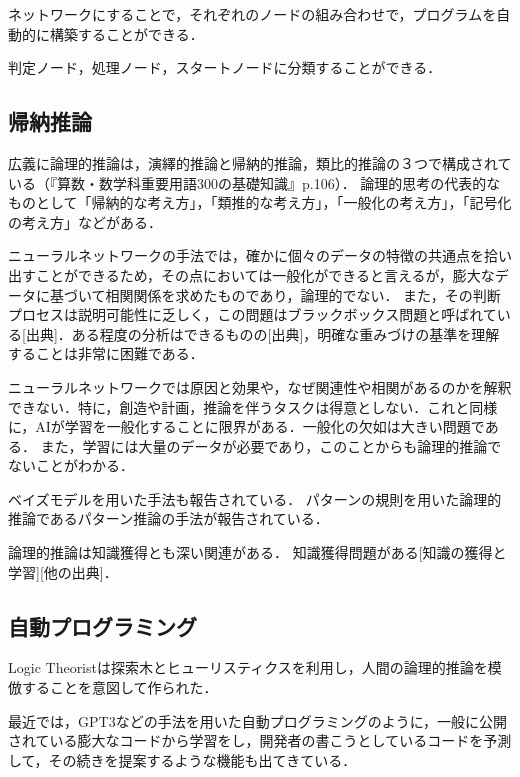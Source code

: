 \documentclass[exploratorypaper]{jsaiart} %
\begin{document}
ネットワークにすることで，それぞれのノードの組み合わせで，プログラムを自動的に構築することができる．

判定ノード，処理ノード，スタートノードに分類することができる．

\subsection{帰納推論}
広義に論理的推論は，演繹的推論と帰納的推論，類比的推論の３つで構成されている（『算数・数学科重要用語300の基礎知識』p.106）．
論理的思考の代表的なものとして「帰納的な考え方」，「類推的な考え方」，「一般化の考え方」，「記号化の考え方」などがある\cite{saito:11}．

ニューラルネットワークの手法では，確かに個々のデータの特徴の共通点を拾い出すことができるため，その点においては一般化ができると言えるが，膨大なデータに基づいて相関関係を求めたものであり，論理的でない．
また，その判断プロセスは説明可能性に乏しく，この問題はブラックボックス問題と呼ばれている[出典]．ある程度の分析はできるものの[出典]，明確な重みづけの基準を理解することは非常に困難である．

ニューラルネットワークでは原因と効果や，なぜ関連性や相関があるのかを解釈できない．特に，創造や計画，推論を伴うタスクは得意としない．これと同様に，AIが学習を一般化することに限界がある．一般化の欠如は大きい問題である．
また，学習には大量のデータが必要であり，このことからも論理的推論でないことがわかる．

ベイズモデルを用いた手法も報告されている\cite{TENENBAUM2006}．
パターンの規則を用いた論理的推論であるパターン推論の手法が報告されている\cite{tsukimoto:00}\cite{sudo:07}．


論理的推論は知識獲得とも深い関連がある．
知識獲得問題がある\cite{KnowledgeAI}[知識の獲得と学習][他の出典]．
\subsection{自動プログラミング}
Logic Theorist\cite{LogicTheorist}は探索木とヒューリスティクスを利用し，人間の論理的推論を模倣することを意図して作られた．

最近では，GPT3\cite{gpt3}などの手法を用いた自動プログラミングのように，一般に公開されている膨大なコードから学習をし，開発者の書こうとしているコードを予測して，その続きを提案するような機能も出てきている\cite{copilot}．
\end{document}

